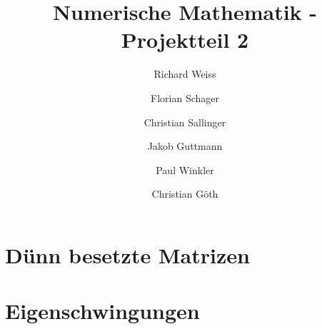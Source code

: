 \documentclass{article}
\title{Numerische Mathematik - Projektteil 2}
\author
{
  Richard Weiss       \and
  Florian Schager     \and
  Christian Sallinger \and
  Jakob Guttmann      \and
  Paul Winkler        \and
  Christian Göth
}
\date{}
\begin{document}
\maketitle

\section{Dünn besetzte Matrizen}

\FloatBarrier
\section{Eigenschwingungen}

\FloatBarrier
%
\end{document}
